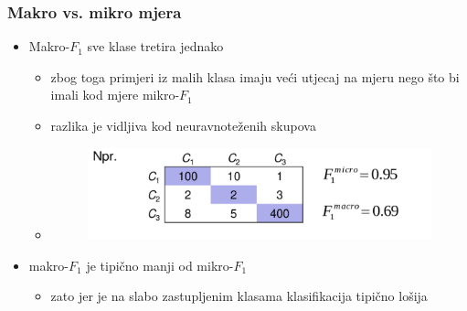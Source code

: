 \documentclass{beamer}
\begin{document}
\begin{frame}[noframenumbering]
	\frametitle{Makro vs. mikro mjera}
	\begin{itemize}
		\item Makro-$F_1$ sve klase tretira jednako
		\begin{itemize}
			\item zbog toga primjeri iz malih klasa imaju veći utjecaj na mjeru nego što bi imali kod mjere mikro-$F_1$
			\item razlika je vidljiva kod neuravnoteženih skupova
			\item 	\begin{figure}[h]
				\centering
				\includegraphics[scale=0.3]{makro_mikro_primjer.png}
			\end{figure}
		\end{itemize} 
		\item makro-$F_1$ je tipično manji od mikro-$F_1$
		\begin{itemize}
			\item zato jer je na slabo zastupljenim klasama klasifikacija tipično lošija
		\end{itemize}
	\end{itemize}
\end{frame}
\end{document}
